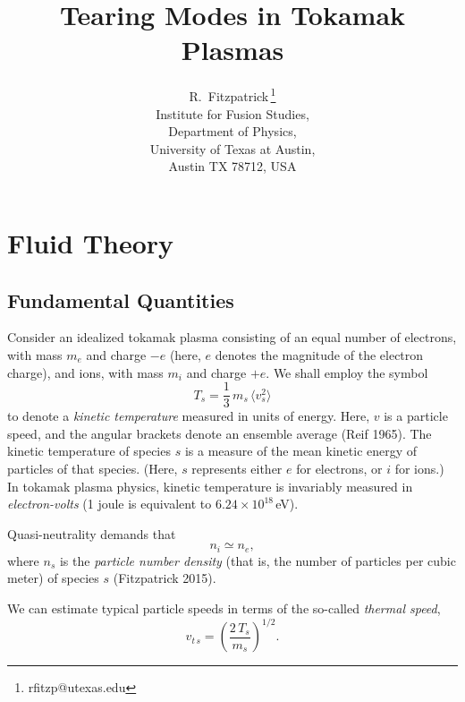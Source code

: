 \documentclass[notitlepage,12pt]{article}
\begin{document}
\title{\bf Tearing Modes in Tokamak Plasmas}
\author{R.~Fitzpatrick\,\footnote{rfitzp@utexas.edu}\\
Institute for Fusion Studies,\\  Department of Physics,\\  University of Texas at Austin,\\  Austin TX 78712, USA}
\maketitle

\section{Fluid Theory}
\subsection{Fundamental Quantities}
Consider an idealized tokamak plasma consisting of an equal number of electrons, with
mass $m_e$ and charge $-e$ (here, $e$ denotes the  magnitude of the electron
charge), and ions, with  mass $m_i$ and charge $+e$. We shall employ 
the symbol
\begin{equation}
T_s = \frac{1}{3} \,m_s\, \langle v_s^{2}\rangle
\end{equation}
to denote a {\em kinetic temperature}\/   measured in units of energy.
Here, $v$ is a particle speed, and the angular brackets denote an
ensemble average (Reif 1965). The kinetic temperature of species $s$ is a measure of 
the mean kinetic energy of particles of
that species. (Here, $s$ represents either $e$ for electrons, or $i$ for ions.) In tokamak plasma physics, kinetic temperature
is invariably measured in {\em electron-volts}\/  (1 joule is equivalent to
$6.24\times 10^{18}$\,eV). 

Quasi-neutrality demands that
\begin{equation}
n_i \simeq n_e, 
\end{equation}
where $n_s$ is the {\em particle number density} (that is, the number of particles 
per cubic meter) of species $s$ (Fitzpatrick 2015). 

We can
estimate typical particle speeds in terms of the so-called {\em thermal speed}, 
\begin{equation}\label{e1.3}
v_{t\,s} = \left(\frac{2\,T_s}{m_s}\right)^{1/2}.
\end{equation}
\end{document}
